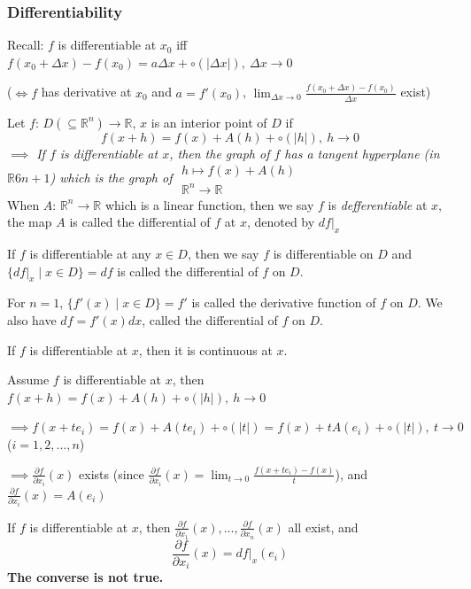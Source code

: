 \subsubsection[多变量函数的可微性]{Differentiability}

Recall: $f$ is differentiable at $x_0$ iff $f(x_0+\Delta x)-f(x_0)=a\Delta x+\circ(|\Delta x|),\ \Delta x\to 0$

($\iff f$ has derivative at $x_0$ and $a=f'(x_0)$, $\lim_{\Delta x\to 0}\frac{f(x_0+\Delta x)-f(x_0)}{\Delta x}$ exist)

\begin{define}
    Let $f:\,D(\subseteq\mathbb{R}^n)\to\mathbb{R}$, $x$ is an interior point of $D$ if
    $$
        f(x+h)=f(x)+A(h)+\circ(|h|),\ h\to0
    $$
    \emph{$\implies$ If $f$ is differentiable at $x$, then the graph of $f$ has a tangent \emph{hyperplane} (in $\mathbb{R}6{n+1}$) which is the graph of $\substack{h\mapsto f(x)+A(h)\\\mathbb{R}^n\to\mathbb{R}}$}\\
    When $A:\,\mathbb{R}^n\to\mathbb{R}$ which is a linear function, then we say $f$ is \emph{defferentiable} at $x$, the map $A$ is called the differential of $f$ at $x$, denoted by $df|_x$

    If $f$ is differentiable at any $x\in D$, then we say $f$ is differentiable on $D$ and $\{df|_x\mid x\in D\}=df$ is called the differential of $f$ on $D$.
\end{define}

\begin{rmk}
    For $n=1$, $\{f'(x)\mid x\in D\}=f'$ is called the derivative function of $f$ on $D$. We also have $df=f'(x)dx$, called the differential of $f$ on $D$.
\end{rmk}

\begin{thm}
    If $f$ is differentiable at $x$, then it is continuous at $x$.
\end{thm}

Assume $f$ is differentiable at $x$, then $f(x+h)=f(x)+A(h)+\circ(|h|),\ h\to0$

$\implies f(x+te_i)=f(x)+A(te_i)+\circ(|t|)=f(x)+tA(e_i)+\circ(|t|),\ t\to0$ ($i=1,2,\dots,n$)

$\implies \frac{\partial f}{\partial x_i}(x)$ exists (since $\frac{\partial f}{\partial x_i}(x)=\lim_{t\to 0}\frac{f(x+te_i)-f(x)}{t}$), and $\frac{\partial f}{\partial x_i}(x)=A(e_i)$

\begin{thm}
    If $f$ is differentiable at $x$, then $\frac{\partial f}{\partial x_1}(x),\dots,\frac{\partial f}{\partial x_n}(x)$ all exist, and
    $$
        \frac{\partial f}{\partial x_i}(x)=df|_x(e_i)
    $$
    \textbf{The converse is not true.}
\end{thm}


